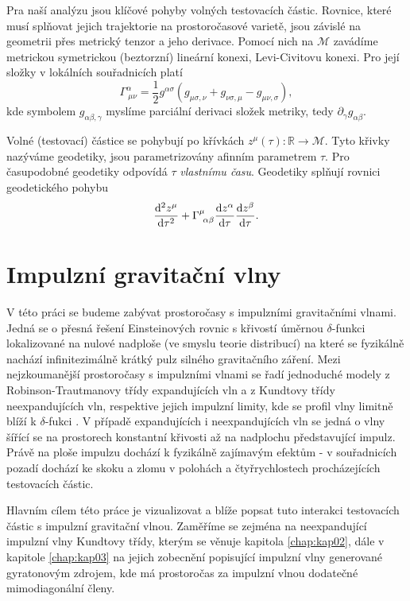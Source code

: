 Pra naší analýzu jsou klíčové pohyby volných testovacích částic. Rovnice, které musí splňovat jejich trajektorie na prostoročasové varietě, jsou závislé na geometrii přes metrický tenzor a jeho derivace.
Pomocí nich na $\mathcal{M}$ zavádíme metrickou symetrickou (beztorzní) lineární konexi, Levi-Civitovu konexi. Pro její složky v lokálních souřadnicích platí
\begin{equation}
    \label{eq:affine_connection}
    \Gamma^\alpha_{~\mu \nu} = \frac{1}{2} g^{\alpha \sigma} \left( g_{\mu \sigma,\nu} + g_{\nu \sigma, \mu} - g_{\mu \nu, \sigma}\right),
\end{equation}
kde symbolem $g_{\alpha \beta, \gamma}$ myslíme parciální derivaci složek metriky, tedy $\partial_\gamma g_{\alpha \beta}$.

Volné (testovací) částice se pohybují po křívkách $z^\mu(\tau): \mathbb{R} \to \mathcal{M}$. Tyto křivky nazýváme geodetiky, jsou parametrizovány afinním parametrem $\tau$. Pro časupodobné geodetiky
odpovídá $\tau$ \emph{vlastnímu času}. Geodetiky splňují rovnici geodetického pohybu
\begin{equation}
    \label{eq:geodesic_equation}
    \frac{\mathrm{d}^2 z^\mu}{\mathrm{d} \tau^2} + \Gamma^\mu_{~\alpha \beta} \frac{\mathrm{d} z^\alpha}{\mathrm{d} \tau} \frac{\mathrm{d} z^\beta}{\mathrm{d} \tau}.
\end{equation}


\section*{Impulzní gravitační vlny}
V této práci se budeme zabývat prostoročasy s impulzními gravitačními vlnami. Jedná se o přesná řešení Einsteinových rovnic s křivostí úměrnou $\delta$-funkci lokalizované
na nulové nadploše (ve smyslu teorie distribucí) na které se fyzikálně nachází infinitezimálně krátký pulz silného gravitačního záření.
Mezi nejzkoumanější prostoročasy s impulzními vlnami se řadí jednoduché modely z Robinson-Trautmanovy třídy expandujících vln a z Kundtovy třídy
neexpandujících vln, respektive jejich impulzní limity, kde se profil vlny limitně blíží k $\delta$-fukci \cite{griffiths_podolsky_2009} \cite{PODOLSK2002}.
V případě expandujících i neexpandujících vln se jedná o vlny šířící se na prostorech konstantní křivosti až na nadplochu představující impulz.
Právě na ploše impulzu dochází k fyzikálně zajímavým efektům - v souřadnicích pozadí dochází ke skoku a zlomu v polohách a čtyřrychlostech
procházejících testovacích částic.

Hlavním cílem této práce je vizualizovat a blíže popsat tuto interakci testovacích částic s impulzní gravitační vlnou. Zaměříme se
zejména na neexpandující impulzní vlny Kundtovy třídy, kterým se věnuje kapitola \ref{chap:kap02}, dále v kapitole \ref{chap:kap03} na jejich zobecnění popisující impulzní vlny generované
gyratonovým zdrojem, kde má prostoročas za impulzní vlnou dodatečné mimodiagonální členy.

